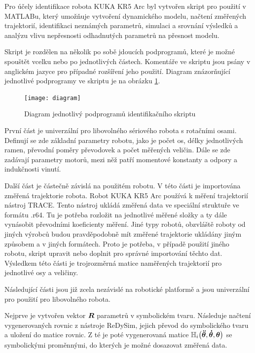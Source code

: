 Pro účely identifikace robota KUKA KR5 Arc byl vytvořen skript pro použití v MATLABu, který umožňuje vytvoření dynamického modelu, načtení změřených trajektorií, identifikaci neznámých parametrů, simulaci a srovnání výsledků a analýzu vlivu nepřesnosti odhadnutých parametrů na přesnost modelu.

Skript je rozdělen na několik po sobě jdoucích podprogramů, které je možné spouštět vcelku nebo po jednotlivých částech. Komentáře ve skriptu jsou psány v anglickém jazyce pro případné rozšíření jeho použití. Diagram znázorňující jednotlivé podprogramy ve skriptu je na obrázku \ref{diagram_pic}.

\begin{figure}[ht]
    \texttt{[image: diagram]}
    \caption{Diagram jednotlivý podprogramů identifikačního skriptu}
    \label{diagram_pic}
\end{figure}

První část je univerzální pro libovolného sériového robota s rotačními osami. Definují se zde základní parametry robotu, jako je počet os, délky jednotlivých ramen, převodní poměry převodovek a počet měřených veličin. Dále se zde zadávají parametry motorů, mezi něž patří momentové konstanty a odpory a indukčnosti vinutí. 

Další část je částečně závislá na použitém robotu. V této části je importována změřená trajektorie robota. Robot KUKA KR5 Arc používá k měření trajektorií nástroj TRACE. Tento nástroj ukládá změřená data ve speciální struktuře ve formátu .r64. Tu je potřeba rozložit na jednotlivé měřené složky a ty dále vynásobit převodními koeficienty měření. Jiné typy robotů, obzvláště roboty od jiných výrobců budou pravděpodobně mít změřené trajektorie ukládány jiným způsobem a v jiných formátech. Proto je potřeba, v případě použití jiného robotu, skript upravit nebo doplnit pro správné importování těchto dat. Výsledkem této části je trojrozměrná matice naměřených trajektorií pro jednotlivé osy a veličiny. 

Následující části jsou již zcela nezávislé na robotické platformě a jsou univerzální pro použití pro libovolného robota.  

Nejprve je vytvořen vektor $\boldsymbol{R}$ parametrů v symbolickém tvaru. Následuje načtení vygenerovaných rovnic z nástroje ReDySim, jejich převod do symbolického tvaru a uložení do matice rovnic. Z té je poté vygenerovaná matice $\mathbb{H}_i\big(\boldsymbol{\ddot{\theta}},\boldsymbol{\dot{\theta}},\boldsymbol{\theta}\big)$ se symbolickými proměnnými, do kterých je možné dosazovat změřená data.

